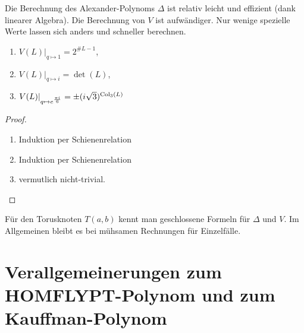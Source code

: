 \begin{nt}
    Die Berechnung des Alexander-Polynoms $\Delta$ ist relativ leicht und effizient (dank linearer Algebra).
    Die Berechnung von $V$ ist aufwändiger.
    Nur wenige spezielle Werte lassen sich anders und schneller berechnen.
\end{nt}

\begin{prop}
    \begin{enumerate}[1)]
        \item
            $V(L)|_{q\mapsto 1} = 2^{\# L - 1}$,
        \item
            $V(L)|_{q\mapsto i} = \det(L)$,
        \item
            $V(L)|_{q\mapsto e^{\frac{\pi i}{6}}} = \pm (i\sqrt{3})^{\operatorname{Col}_3(L)}$
    \end{enumerate}
    \begin{proof}
        \begin{enumerate}[1)]
            \item
                Induktion per Schienenrelation
            \item
                Induktion per Schienenrelation
            \item
                vermutlich nicht-trivial.
        \end{enumerate}
    \end{proof}
\end{prop}

\begin{nt}
    Für den Torusknoten $T(a,b)$ kennt man geschlossene Formeln für $\Delta$ und $V$.
    Im Allgemeinen bleibt es bei mühsamen Rechnungen für Einzelfälle.
\end{nt}


\section{Verallgemeinerungen zum HOMFLYPT-Polynom und zum Kauffman-Polynom}

